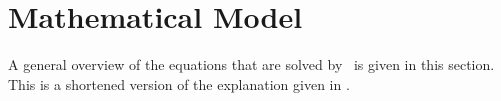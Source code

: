 \section{Mathematical Model}
\label{sec:model}

A general overview of the equations that are solved by \CM~is given in this section.
This is a shortened version of the explanation given in \cite{gerach2022personalized}.


